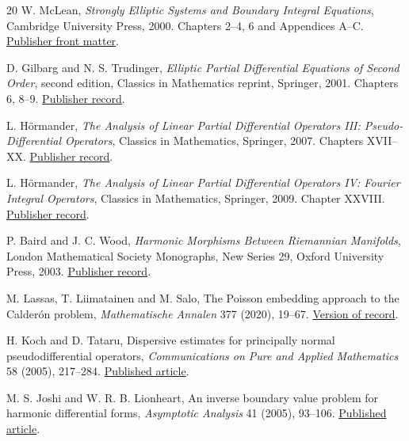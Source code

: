 \documentclass[11pt]{article}
\theoremstyle{definition}
\theoremstyle{remark}
\numberwithin{equation}{section}
\begin{document}
\begin{thebibliography}{20}
W. McLean, \emph{Strongly Elliptic Systems and Boundary Integral Equations},
Cambridge University Press, 2000. Chapters 2--4, 6 and Appendices A--C.
\href{https://assets.cambridge.org/97805216/63328/frontmatter/9780521663328_frontmatter.pdf}{Publisher front matter}.

D. Gilbarg and N. S. Trudinger, \emph{Elliptic Partial Differential
Equations of Second Order}, second edition, Classics in Mathematics
reprint, Springer, 2001. Chapters 6, 8--9.
\href{https://doi.org/10.1007/978-3-642-61798-0}{Publisher record}.

L. H\"ormander, \emph{The Analysis of Linear Partial Differential
Operators III: Pseudo-Differential Operators}, Classics in Mathematics,
Springer, 2007. Chapters XVII--XX.
\href{https://doi.org/10.1007/978-3-540-49938-1}{Publisher record}.

L. H\"ormander, \emph{The Analysis of Linear Partial Differential
Operators IV: Fourier Integral Operators}, Classics in Mathematics,
Springer, 2009. Chapter XXVIII.
\href{https://doi.org/10.1007/978-3-642-00136-9}{Publisher record}.

P. Baird and J. C. Wood, \emph{Harmonic Morphisms Between Riemannian
Manifolds}, London Mathematical Society Monographs, New Series 29,
Oxford University Press, 2003.
\href{https://doi.org/10.1093/acprof:oso/9780198503620.001.0001}{Publisher record}.

M. Lassas, T. Liimatainen and M. Salo, The Poisson embedding approach
to the Calder\'on problem, \emph{Mathematische Annalen} 377 (2020),
19--67. \href{https://doi.org/10.1007/s00208-019-01818-3}{Version of record}.

H. Koch and D. Tataru, Dispersive estimates for principally normal
pseudodifferential operators, \emph{Communications on Pure and Applied
Mathematics} 58 (2005), 217--284.
\href{https://doi.org/10.1002/cpa.20067}{Published article}.

M. S. Joshi and W. R. B. Lionheart, An inverse boundary value problem
for harmonic differential forms, \emph{Asymptotic Analysis} 41 (2005),
93--106. \href{https://doi.org/10.3233/ASY-2005-660}{Published article}.


\end{thebibliography}
\end{document}

